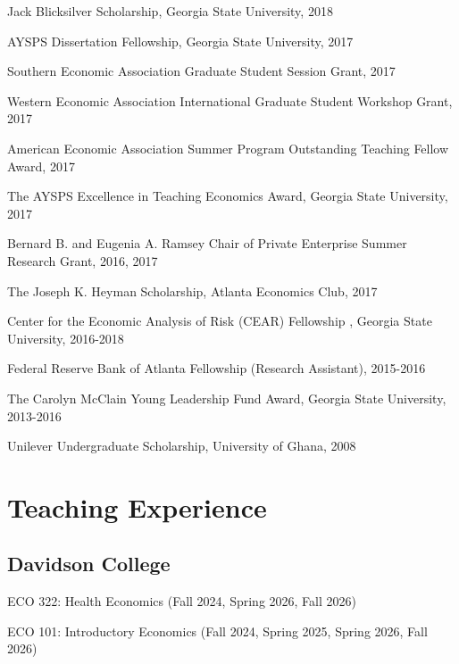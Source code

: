 \documentclass[12pt,letterpaper]{article}
\renewenvironment{itemize}{
	\begin{list}{}{
			\setlength{\leftmargin}{1em}
			\setlength{\itemsep}{0.15em}
			\setlength{\parskip}{0pt}
			\setlength{\parsep}{0.2em}
		}
	}{
	\end{list}
}
\begin{document}
\begin{itemize}
    \item Jack Blicksilver Scholarship, Georgia State University, 2018
	\item AYSPS Dissertation Fellowship, Georgia State University, 2017 
	\item Southern Economic Association Graduate Student Session Grant, 2017 
	\item Western Economic Association International Graduate Student Workshop Grant, 2017
	\item American Economic Association Summer Program Outstanding Teaching Fellow Award, 2017
	\item The AYSPS Excellence in Teaching Economics Award, Georgia State University, 2017
	\item Bernard B. and Eugenia A. Ramsey Chair of Private Enterprise Summer Research Grant, 2016, 2017
	\item The Joseph K. Heyman Scholarship, Atlanta Economics Club, 2017
	\item Center for the Economic Analysis of Risk (CEAR) Fellowship	, Georgia State University, 2016-2018
	\item Federal Reserve Bank of Atlanta Fellowship (Research Assistant), 2015-2016
	\item The Carolyn McClain Young Leadership Fund Award, Georgia State University, 2013-2016
	\item Unilever Undergraduate Scholarship, University of Ghana, 2008
\end{itemize}

\section*{Teaching Experience}

\subsection*{Davidson College}
\begin{itemize}
\item ECO 322: Health Economics (Fall 2024, Spring 2026, Fall 2026)
\item ECO 101: Introductory Economics (Fall 2024, Spring 2025, Spring 2026, Fall 2026)
\end{itemize}
\end{document}
